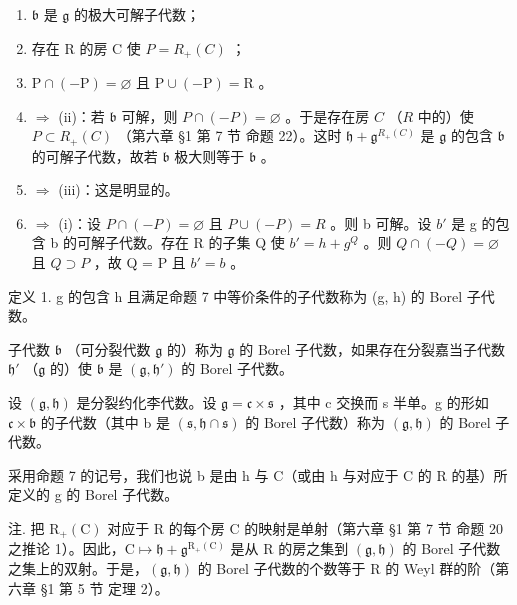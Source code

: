 \begin{enumerate}
\def\labelenumi{(\roman{enumi})}
\item
  \(\mathfrak{b}\) 是 \(\mathfrak{g}\) 的极大可解子代数；
\item
  存在 R 的房 C 使 \(P = R_{+}(C)\) ；
\item
  \(\mathrm{P} \cap (-\mathrm{P}) = \varnothing\) 且 \(\mathrm{P} \cup (-\mathrm{P}) = \mathrm{R}\) 。
\item
  \(\Longrightarrow\) (ii)：若 \(\mathfrak{b}\) 可解，则 \(P \cap (-P) = \varnothing\) 。于是存在房 \(C\) （\(R\) 中的）使 \(P \subset R_{+}(C)\) （第六章 §1 第 7 节 命题 22）。这时 \(\mathfrak{h} + \mathfrak{g}^{R_{+}(C)}\) 是 \(\mathfrak{g}\) 的包含 \(\mathfrak{b}\) 的可解子代数，故若 \(\mathfrak{b}\) 极大则等于 \(\mathfrak{b}\) 。
\item
  \(\Longrightarrow\) (iii)：这是明显的。
\item
  \(\Longrightarrow\) (i)：设 \(P \cap (-P) = \varnothing\) 且 \(P \cup (-P) = R\) 。则 b 可解。设 \(b'\) 是 g 的包含 b 的可解子代数。存在 R 的子集 Q 使 \(b' = h + g^{Q}\) 。则 \(Q \cap (-Q) = \varnothing\) 且 \(Q \supset P\) ，故 Q = P 且 \(b' = b\) 。
\end{enumerate}

定义 1. g 的包含 h 且满足命题 7 中等价条件的子代数称为 (g, h) 的 Borel 子代数。

子代数 \(\mathfrak{b}\) （可分裂代数 \(\mathfrak{g}\) 的）称为 \(\mathfrak{g}\) 的 Borel 子代数，如果存在分裂嘉当子代数 \(\mathfrak{h}'\) （\(\mathfrak{g}\) 的）使 \(\mathfrak{b}\) 是 \((\mathfrak{g},\mathfrak{h}')\) 的 Borel 子代数。

设 \((\mathfrak{g},\mathfrak{h})\) 是分裂约化李代数。设 \(\mathfrak{g}=\mathfrak{c}\times\mathfrak{s}\) ，其中 c 交换而 s 半单。g 的形如 \(\mathfrak{c}\times\mathfrak{b}\) 的子代数（其中 b 是 \((\mathfrak{s},\mathfrak{h}\cap\mathfrak{s})\) 的 Borel 子代数）称为 \((\mathfrak{g},\mathfrak{h})\) 的 Borel 子代数。

采用命题 7 的记号，我们也说 b 是由 h 与 C（或由 h 与对应于 C 的 R 的基）所定义的 g 的 Borel 子代数。

注. 把 \(\mathrm{R}_{+}(\mathrm{C})\) 对应于 R 的每个房 C 的映射是单射（第六章 §1 第 7 节 命题 20 之推论 1）。因此，\(\mathrm{C} \mapsto \mathfrak{h} + \mathfrak{g}^{\mathrm{R}_{+}(\mathrm{C})}\) 是从 R 的房之集到 \((\mathfrak{g}, \mathfrak{h})\) 的 Borel 子代数之集上的双射。于是，\((\mathfrak{g}, \mathfrak{h})\) 的 Borel 子代数的个数等于 R 的 Weyl 群的阶（第六章 §1 第 5 节 定理 2）。

